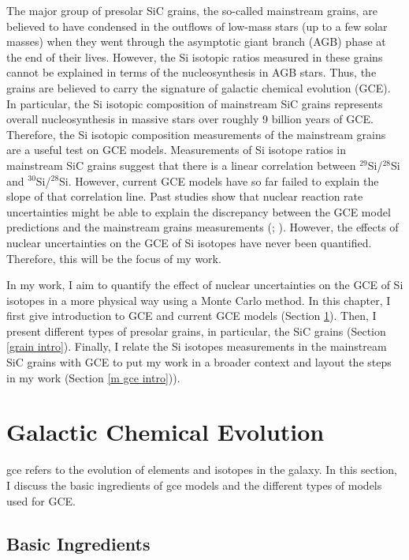 \documentclass{brandeis-thesis3.2}
\newcommand{\iso}[2]{$^{#1}${#2}}
\begin{document}
The major group of presolar SiC grains, the so-called mainstream grains, are believed to have condensed in the outflows of low-mass stars (up to a few solar masses) when they went through the asymptotic giant branch (AGB) phase at the end of their lives. However, the Si isotopic ratios measured in these grains cannot be explained in terms of the nucleosynthesis in AGB stars. Thus, the grains are believed to carry the signature of galactic chemical evolution (GCE). In particular, the Si isotopic composition of mainstream SiC grains represents overall nucleosynthesis in massive stars over roughly 9 billion years of GCE. Therefore, the Si isotopic composition measurements of the mainstream grains are a useful test on GCE models. Measurements of Si isotope ratios in mainstream SiC grains suggest that there is a linear correlation between \iso{29}{Si}/\iso{28}{Si} and \iso{30}{Si}/\iso{28}{Si}. However, current GCE models have so far failed to explain the slope of that correlation line. Past studies show that nuclear reaction rate uncertainties might be able to explain the discrepancy between the GCE model predictions and the mainstream grains measurements (\cite{Timmes_1996}; \cite{Hoppe_2009}). However, the effects of nuclear uncertainties on the GCE of Si isotopes have never been quantified. Therefore, this will be the focus of my work.

In my work, I aim to quantify the effect of nuclear uncertainties on the GCE of Si isotopes in a more physical way using a Monte Carlo method. In this chapter, I first give introduction to GCE and current GCE models (Section \ref{gce intro}). Then, I present different types of presolar grains, in particular, the SiC grains (Section \ref{grain intro}). Finally, I relate the Si isotopes measurements in the mainstream SiC grains with GCE to put my work in a broader context and layout the steps in my work (Section \ref{m gce intro})).

\section{Galactic Chemical Evolution} \label{gce intro}

\Ac{gce} refers to the evolution of elements and isotopes in the galaxy. In this section, I discuss the basic ingredients of \ac{gce} models and the different types of models used for GCE.

\subsection{Basic Ingredients}
\end{document}
